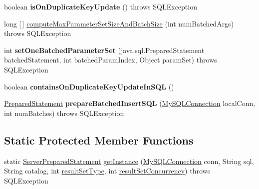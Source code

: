 \begin{DoxyCompactItemize}
boolean {\bfseries is\+On\+Duplicate\+Key\+Update} ()  throws S\+Q\+L\+Exception 
\item 
long \mbox{[}$\,$\mbox{]} \mbox{\hyperlink{classcom_1_1mysql_1_1jdbc_1_1_server_prepared_statement_ace22ac37c1b74c974d8adae7af09f4f5}{compute\+Max\+Parameter\+Set\+Size\+And\+Batch\+Size}} (int num\+Batched\+Args)  throws S\+Q\+L\+Exception 
\item 
\mbox{\label{classcom_1_1mysql_1_1jdbc_1_1_server_prepared_statement_a1312acda9075d9eb4fe7836a4a6eb2cb}} 
int {\bfseries set\+One\+Batched\+Parameter\+Set} (java.\+sql.\+Prepared\+Statement batched\+Statement, int batched\+Param\+Index, Object param\+Set)  throws S\+Q\+L\+Exception 
\item 
\mbox{\label{classcom_1_1mysql_1_1jdbc_1_1_server_prepared_statement_a7475f11f4e38e808ec6df826ff2c9cac}} 
boolean {\bfseries contains\+On\+Duplicate\+Key\+Update\+In\+S\+QL} ()
\item 
\mbox{\label{classcom_1_1mysql_1_1jdbc_1_1_server_prepared_statement_a0ff7ea01539ab67fd64f5e10b033c6a0}} 
\mbox{\hyperlink{classcom_1_1mysql_1_1jdbc_1_1_prepared_statement}{Prepared\+Statement}} {\bfseries prepare\+Batched\+Insert\+S\+QL} (\mbox{\hyperlink{interfacecom_1_1mysql_1_1jdbc_1_1_my_s_q_l_connection}{My\+S\+Q\+L\+Connection}} local\+Conn, int num\+Batches)  throws S\+Q\+L\+Exception 
\end{DoxyCompactItemize}
\subsection*{Static Protected Member Functions}
\begin{DoxyCompactItemize}
\item 
static \mbox{\hyperlink{classcom_1_1mysql_1_1jdbc_1_1_server_prepared_statement}{Server\+Prepared\+Statement}} \mbox{\hyperlink{classcom_1_1mysql_1_1jdbc_1_1_server_prepared_statement_af8dc86dfa81a0998b2462a95b0f754a6}{get\+Instance}} (\mbox{\hyperlink{interfacecom_1_1mysql_1_1jdbc_1_1_my_s_q_l_connection}{My\+S\+Q\+L\+Connection}} conn, String sql, String catalog, int \mbox{\hyperlink{classcom_1_1mysql_1_1jdbc_1_1_statement_impl_a9c4013da0e1b73577723769660e4ff25}{result\+Set\+Type}}, int \mbox{\hyperlink{classcom_1_1mysql_1_1jdbc_1_1_statement_impl_aca243fcfce2d3a1be8a97d643b83ddc3}{result\+Set\+Concurrency}})  throws S\+Q\+L\+Exception 
\end{DoxyCompactItemize}

